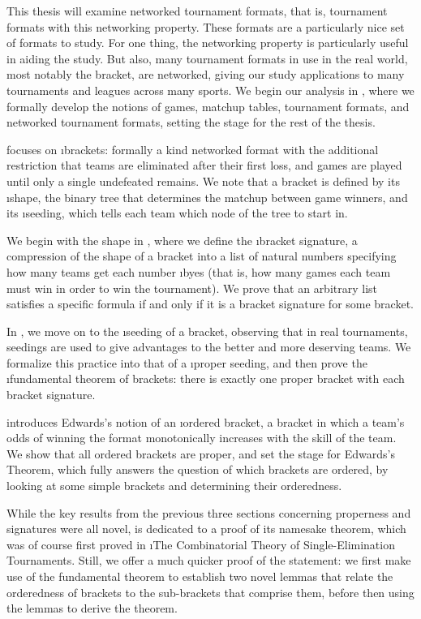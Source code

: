 {    This thesis will examine networked tournament formats, that is, tournament formats with this networking property. These formats are a particularly nice set of formats to study. For one thing, the networking property is particularly useful in aiding the study. But also, many tournament formats in use in the real world, most notably the bracket, are networked, giving our study applications to many tournaments and leagues across many sports. We begin our analysis in , where we formally develop the notions of games, matchup tables, tournament formats, and networked tournament formats, setting the stage for the rest of the thesis.
    
     focuses on \i{brackets}: formally a kind networked format with the additional restriction that teams are eliminated after their first loss, and games are played until only a single undefeated remains. We note that a bracket is defined by its \i{shape}, the binary tree that determines the matchup between game winners, and its \i{seeding}, which tells each team which node of the tree to start in.

    We begin with the shape in , where we define the \i{bracket signature}, a compression of the shape of a bracket into a list of natural numbers specifying how many teams get each number \i{byes} (that is, how many games each team must win in order to win the tournament). We prove that an arbitrary list satisfies a specific formula if and only if it is a bracket signature for some bracket.

    In , we move on to the \i{seeding} of a bracket, observing that in real tournaments, seedings are used to give advantages to the better and more deserving teams. We formalize this practice into that of a \i{proper seeding}, and then prove the \i{fundamental theorem of brackets}: there is exactly one proper bracket with each bracket signature.

     introduces Edwards's \cite{montana} notion of an \i{ordered bracket}, a bracket in which a team's odds of winning the format monotonically increases with the skill of the team. We show that all ordered brackets are proper, and set the stage for Edwards's Theorem, which fully answers the question of which brackets are ordered, by looking at some simple brackets and determining their orderedness.

    While the key results from the previous three sections concerning properness and signatures were all novel,  is dedicated to a proof of its namesake theorem, which was of course first proved in \i{The Combinatorial Theory of Single-Elimination Tournaments}. Still, we offer a much quicker proof of the statement: we first make use of the fundamental theorem to establish two novel lemmas that relate the orderedness of brackets to the sub-brackets that comprise them, before then using the lemmas to derive the theorem.

}
